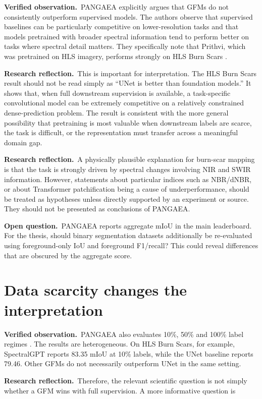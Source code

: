 \documentclass[11pt,a4paper]{article}
\newcommand{\verified}{\textcolor{verifiedgreen}{\textbf{Verified observation.}}}
\newcommand{\reflection}{\textcolor{reflectionorange}{\textbf{Research reflection.}}}
\newcommand{\openquestion}{\textcolor{questionblue}{\textbf{Open question.}}}
\begin{document}
\verified\ PANGAEA explicitly argues that GFMs do not consistently outperform supervised
models. The authors observe that supervised baselines can be particularly competitive on
lower-resolution tasks and that models pretrained with broader spectral information tend to
perform better on tasks where spectral detail matters. They specifically note that Prithvi,
which was pretrained on HLS imagery, performs strongly on HLS Burn Scars \cite{pangaea}.

\reflection\ This is important for interpretation. The HLS Burn Scars result should not be
read simply as ``UNet is better than foundation models.'' It shows that, when full downstream
supervision is available, a task-specific convolutional model can be extremely competitive
on a relatively constrained dense-prediction problem. The result is consistent with the more
general possibility that pretraining is most valuable when downstream labels are scarce,
the task is difficult, or the representation must transfer across a meaningful domain gap.

\reflection\ A physically plausible explanation for burn-scar mapping is that the task is
strongly driven by spectral changes involving NIR and SWIR information. However, statements
about particular indices such as NBR/dNBR, or about Transformer patchification being a cause
of underperformance, should be treated as hypotheses unless directly supported by an
experiment or source. They should not be presented as conclusions of PANGAEA.

\openquestion\ PANGAEA reports aggregate mIoU in the main leaderboard. For the thesis, should
binary segmentation datasets additionally be re-evaluated using foreground-only IoU and
foreground F1/recall? This could reveal differences that are obscured by the aggregate score.

\section{Data scarcity changes the interpretation}

\verified\ PANGAEA also evaluates 10\%, 50\% and 100\% label regimes \cite{pangaea}. The
results are heterogeneous. On HLS Burn Scars, for example, SpectralGPT reports 83.35 mIoU at
10\% labels, while the UNet baseline reports 79.46. Other GFMs do not necessarily outperform
UNet in the same setting.

\reflection\ Therefore, the relevant scientific question is not simply whether a GFM wins
with full supervision. A more informative question is
\end{document}
